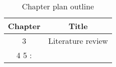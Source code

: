 \begin{table}[h!]
\centering
\begin{tabular}{cc}
{Chapter} & {Title} \\ \midrule
{3} & {Literature review} \\
{4}
{5}
:
\end{tabular}
\caption{Chapter plan outline}
\label{table:1}
\end{table}